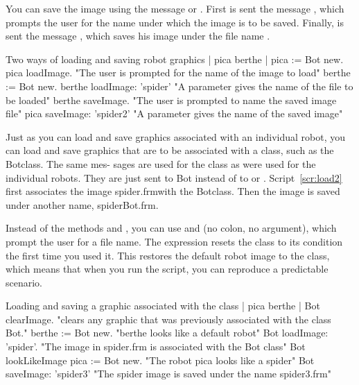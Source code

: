 \documentclass[a4paper,10pt,twoside]{book}
\begin{document}
You can save the image using the message  or . First 
 is sent the message , which prompts the user for the name under which the 
image is to be saved. Finally,  is sent the message , which saves his 
image under the file name . 




\begin{script}[load1]{Two ways of loading and saving robot graphics}
	| pica berthe | 
	pica := Bot new. 
	pica loadImage.             "The user is prompted for the name of the image to load" 
	berthe := Bot new. 
	berthe loadImage: 'spider'   "A parameter gives the name of the file to be loaded" 
	berthe saveImage.           "The user is prompted to name the saved image file" 
	pica saveImage: 'spider2'   "A parameter gives the name of the saved image" 
\end{script}

Just as you can load and save graphics associated with an individual robot, you can load 
and save graphics that are to be associated with a class, such as the Botclass. The same mes- 
sages are used for the class as were used for the individual robots. They are just sent to Bot 
instead of to or . Script~\ref{scr:load2} first associates the image spider.frmwith the Botclass. 
Then the image is saved under another name, spiderBot.frm. 

Instead of the methods  and , you can use  and  
(no colon, no argument), which prompt the user for a file name. The expression  
resets the  class to its condition the first time you used it. This restores the default robot 
image to the class, which means that when you run the script, you can reproduce a predictable 
scenario. 

\begin{script}[load2]{Loading and saving a graphic associated with the  class}
| pica berthe | 
Bot clearImage.           "clears any graphic that was previously associated 
with the class Bot." 
berthe := Bot new.        "berthe looks like a default robot" 
Bot loadImage: 'spider'.  "The image in spider.frm is associated with the Bot class" 
Bot lookLikeImage 
pica := Bot new.          "The robot pica looks like a spider" 
Bot saveImage: 'spider3'  "The spider image is saved under the name spider3.frm" 
\end{script}
\end{document}
